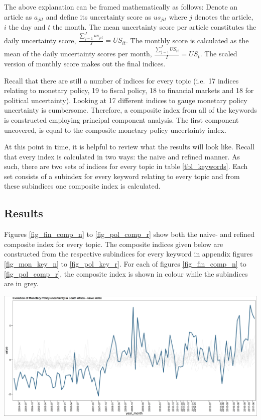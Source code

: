 \documentclass[11pt,preprint, authoryear]{elsarticle}
\let\origfigure\figure
\let\endorigfigure\endfigure
\renewenvironment{figure}[1][2] {
    \expandafter\origfigure\expandafter[H]
} {
    \endorigfigure
}
\numberwithin{equation}{section}
\numberwithin{figure}{section}
\numberwithin{table}{section}
\begin{document}
The above explanation can be framed mathematically as follows: Denote an
article as \(a_{jit}\) and define its uncertainty score as \(us_{jit}\)
where \(j\) denotes the article, \(i\) the day and \(t\) the month. The
mean uncertainty score per article constitutes the daily uncertainty
score, \(\frac{\sum_{j=1}^Jus_{jit}}{J}= US_{it}\). The monthly score is
calculated as the mean of the daily uncertainty scores per month,
\(\frac{\sum_{j=1}^JUS_{it}}{I}= US_{t}\). The scaled version of monthly score makes out the final indices.

Recall that there are still a number of indices for every topic (i.e.~17
indices relating to monetary policy, 19 to fiscal policy, 18 to
financial markets and 18 for political uncertainty). Looking at 17
different indices to gauge monetary policy uncertainty is cumbersome.
Therefore, a composite index from all of the keywords is constructed
employing principal component analysis. The first component uncovered,
is equal to the composite monetary policy uncertainty index.

At this point in time, it is helpful to review what the results will
look like. Recall that every index is calculated in two ways: the naive
and refined manner. As such, there are two sets of indices for every
topic in table \ref{tbl_keywords}. Each set consists of a subindex for
every keyword relating to every topic and from these subindices one
composite index is calculated.

\subsection{\texorpdfstring{Results
\label{sec_results}}{Results }}\label{results}
Figures \ref{fig_fin_comp_n} to \ref{fig_pol_comp_r} show both the naive- and refined composite index for every topic. The composite indices given below are constructed from the respective subindices for every keyword in appendix figures \ref{fig_mon_key_n} to \ref{fig_pol_key_r}. For each of figures \ref{fig_fin_comp_n} to \ref{fig_pol_comp_r}, the composite index is shown in colour while the subindices are in grey. 

\begin{figure}
	\centering
	\includegraphics[width=\linewidth, keepaspectratio]{bin/monetary_comp_naive}\\
	\caption{Composite Monetary Policy uncertainty naive index. \label{fig_mon_comp_n}}
\end{figure}
\end{document}
